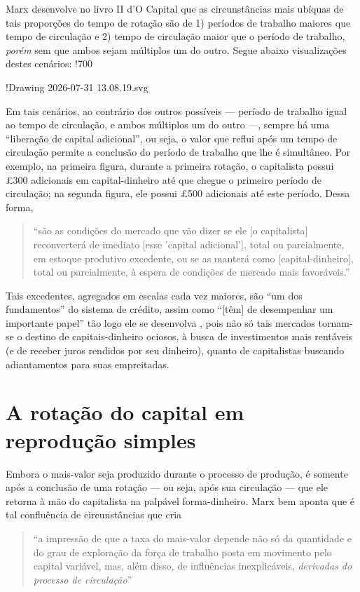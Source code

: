 Marx desenvolve no livro II d'O Capital que as circunstâncias mais ubíquas de tais proporções do tempo de rotação são de 1) períodos de trabalho maiores que tempo de circulação e 2) tempo de circulação maior que o período de trabalho, \textit{porém} sem que ambos sejam múltiplos um do outro. Segue abaixo visualizações destes cenários:
!700

!Drawing 2026-07-31 13.08.19.svg

Em tais cenários, ao contrário dos outros possíveis — período de trabalho igual ao tempo de circulação, e ambos múltiplos um do outro —, sempre há uma ``liberação de capital adicional'', ou seja, o valor que reflui após um tempo de circulação permite a conclusão do período de trabalho que lhe é simultâneo. Por exemplo, na primeira figura, durante a primeira rotação, o capitalista possui £300 adicionais em capital-dinheiro até que chegue o primeiro período de circulação; na segunda figura, ele possui £500 adicionais até este período. Dessa forma, 
\begin{quote}
``são as condições do mercado que vão dizer se ele [o capitalista] reconverterá de imediato [esse 'capital adicional'], total ou parcialmente, em estoque produtivo excedente, ou se as manterá como [capital-dinheiro], total ou parcialmente, à espera de condições de mercado mais favoráveis.'' \parencite[p. 378-9]{Marx2014}
\end{quote}

Tais excedentes, agregados em escalas cada vez maiores, são ``um dos fundamentos'' do sistema de crédito, assim como ``[têm] de desempenhar um importante papel'' tão logo ele se desenvolva \parencite[p. 379]{Marx2014}, pois não só tais mercados tornam-se o destino de capitais-dinheiro ociosos, à busca de investimentos mais rentáveis (e de receber juros rendidos por seu dinheiro), quanto de capitalistas buscando adiantamentos para suas empreitadas.

\section{A rotação do capital em reprodução simples}
Embora o mais-valor seja produzido durante o processo de produção, é somente após a conclusão de uma rotação — ou seja, após sua circulação — que ele retorna à mão do capitalista na palpável forma-dinheiro. Marx bem aponta que é tal confluência de circunstâncias que cria
\begin{quote}
``a impressão de que a taxa do mais-valor depende não só da quantidade e do grau de exploração da força de trabalho posta em movimento pelo capital variável, mas, além disso, de influências inexplicáveis, \textit{derivadas do processo de circulação}'' \parencite[p. 394, grifo meu]{Marx2014}
\end{quote}

